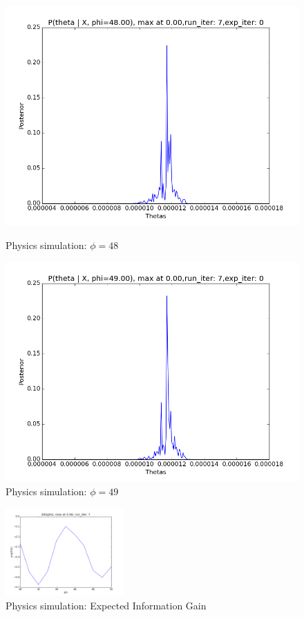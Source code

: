 \documentclass[10pt,journal,compsoc]{IEEEtran}
\begin{document}
\begin{figure}[ht!]
\begin{minipage}[b]{0.5\linewidth}
\includegraphics[width=1\linewidth]{PhysicsPlots/LP8.png} 
\caption{\label{fig:LP8}Physics simulation: $\phi=48$}
\vspace{1ex}
\end{minipage} 
\begin{minipage}[b]{0.5\linewidth}
\centering
\includegraphics[width=1\linewidth]{PhysicsPlots/LP9.png} 
\caption{\label{fig:LP9}Physics simulation: $\phi=49$}
\vspace{1ex}
\end{minipage} 
\end{figure}

\begin{figure}[ht!]
 \centering
  \includegraphics[width=0.4\textwidth]{PhysicsPlots/EIG_average.png}
  \caption{\label{fig:EIGPhys} Physics simulation: Expected Information Gain}
\end{figure}
\end{document}

